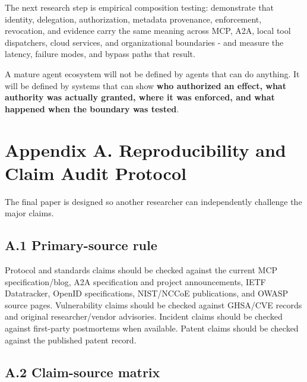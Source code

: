 \documentclass[
  10pt,
  letterpaper,
]{article}
\begin{document}
The next research step is empirical composition testing: demonstrate
that identity, delegation, authorization, metadata provenance,
enforcement, revocation, and evidence carry the same meaning across MCP,
A2A, local tool dispatchers, cloud services, and organizational
boundaries - and measure the latency, failure modes, and bypass paths
that result.

A mature agent ecosystem will not be defined by agents that can do
anything. It will be defined by systems that can show \textbf{who
authorized an effect, what authority was actually granted, where it was
enforced, and what happened when the boundary was tested}.

\section{Appendix A. Reproducibility and Claim Audit
Protocol}\label{appendix-a.-reproducibility-and-claim-audit-protocol}

The final paper is designed so another researcher can independently
challenge the major claims.

\subsection{A.1 Primary-source rule}\label{a.1-primary-source-rule}

Protocol and standards claims should be checked against the current MCP
specification/blog, A2A specification and project announcements, IETF
Datatracker, OpenID specifications, NIST/NCCoE publications, and OWASP
source pages. Vulnerability claims should be checked against GHSA/CVE
records and original researcher/vendor advisories. Incident claims
should be checked against first-party postmortems when available. Patent
claims should be checked against the published patent record.

\subsection{A.2 Claim-source matrix}\label{a.2-claim-source-matrix}
\end{document}
